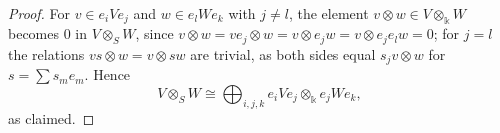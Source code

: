 \begin{supplementary}
\begin{proof}
For $v\in e_iVe_j$ and $w\in e_lWe_k$ with $j\neq l$, the element $v\otimes w\in V\otimes_\Bbbk W$ becomes $0$ in $V\otimes_SW$, since $v\otimes w=ve_j\otimes w=v\otimes e_jw=v\otimes e_je_lw=0$; for $j=l$ the relations $vs\otimes w=v\otimes sw$ are trivial, as both sides equal $s_jv\otimes w$ for $s=\sum s_me_m$.
Hence
\[
V\otimes_SW \cong \bigoplus_{i,j,k} e_i Ve_j \otimes_{\Bbbk} e_j We_k,
\]
as claimed.
%
%
\end{proof}
\end{supplementary}

